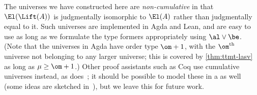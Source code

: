 \begin{rmk}
  The universes we have constructed here are \emph{non-cumulative} in that $\El(\Lift(A))$ is judgmentally isomorphic to $\El(A)$ rather than judgmentally equal to it.
  Such universes are implemented in Agda and Lean, and are easy to use as long as we formulate the type formers appropriately using $\al\vee\be$.
  (Note that the universes in Agda have order type $\om+1$, with the $\om^{\mathrm{th}}$ universe not belonging to any larger universe; this is covered by \cref{thm:ttmt-lasv} as long as $\mu\ge \om+1$.)
  Other proof assistants such as Coq use cumulative universes instead, as does~\cite{hottbook}; it should be possible to model these in a \ttmt as well (some ideas are sketched in~\cite{shulman:invdia,shulman:elreedy}), but we leave this for future work.
\end{rmk}

